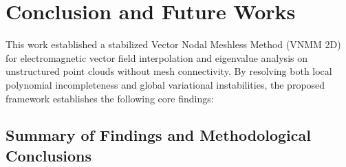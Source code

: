 \documentclass[preprint,12pt]{elsarticle}
\begin{document}
\section{Conclusion and Future Works}
\label{sec:conclusion}

This work established a stabilized Vector Nodal Meshless Method (VNMM 2D) for electromagnetic vector field interpolation and eigenvalue analysis on unstructured point clouds without mesh connectivity. By resolving both local polynomial incompleteness and global variational instabilities, the proposed framework establishes the following core findings:

\subsection{Summary of Findings and Methodological Conclusions}
\label{subsec:summary_conclusions}
\end{document}

